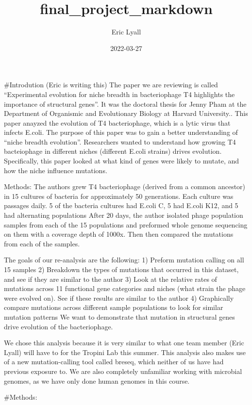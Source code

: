 \documentclass[
]{article}
\title{final\_project\_markdown}
\author{Eric Lyall}
\date{2022-03-27}
\begin{document}
\maketitle

\#Introdution (Eric is writing this) The paper we are reviewing is
called ``Experimental evolution for niche breadth in bacteriophage T4
highlights the importance of structural genes''. It was the doctoral
thesis for Jenny Pham at the Department of Organismic and Evolutionary
Biology at Harvard University.. This paper anayzed the evolution of T4
bacteriophage, which is a lytic virus that infects E.coli. The purpose
of this paper was to gain a better understanding of ``niche breadth
evolution''. Researchers wanted to understand how growing T4
bacteiophage in different niches (different E.coli strains) drives
evolution. Specifically, this paper looked at what kind of genes were
likely to mutate, and how the niche influence mutations.

Methods: The authors grew T4 bacteriophage (derived from a common
ancestor) in 15 cultures of bacteria for approximately 50 generations.
Each culture was passages daily. 5 of the bacteria cultures had E.coli
C, 5 had E.coli K12, and 5 had alternating populations After 20 days,
the author isolated phage population samples from each of the 15
populations and preformed whole genome sequencing on them with a
coverage depth of 1000x. Then then compared the mutations from each of
the samples.

The goals of our re-analysis are the following: 1) Preform mutation
calling on all 15 samples 2) Breakdown the types of mutations that
occurred in this dataset, and see if they are similar to the author 3)
Look at the relative rates of mutations across 11 functional gene
categories and niches (what strain the phage were evolved on). See if
these results are similar to the author 4) Graphically compare mutations
across different sample populations to look for similar mutation
patterns We want to demonstrate that mutation in structural genes drive
evolution of the bacteriophage.

We chose this analysis because it is very similar to what one team
member (Eric Lyall) will have to for the Tropini Lab this summer. This
analysis also makes use of a new mutation-calling tool called breseq,
which neither of us have had previous exposure to. We are also
completely unfamiliar working with microbial genomes, as we have only
done human genomes in this course.

\#Methods:
\end{document}
